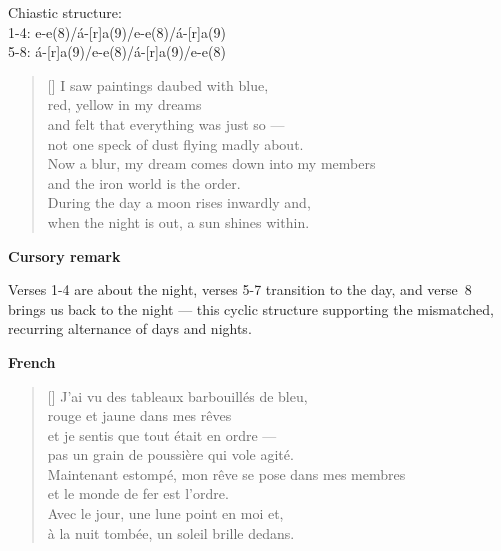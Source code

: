 \documentclass[a4paper,12pt,twoside,final]{book}
\begin{document}

\noindent Chiastic structure: \\
1-4: e-e(8)/á-[r]a(9)/e-e(8)/á-[r]a(9) \\
5-8: á-[r]a(9)/e-e(8)/á-[r]a(9)/e-e(8)

\newpage



\settowidth{\versewidth}{Now a blur, my dream comes down into my members}

\begin{verse}[\versewidth]
  I saw paintings daubed with blue, \\
  red, yellow in my dreams \\
  and felt that everything was just so ---\\
  not one speck of dust flying madly about. \\
  Now a blur, my dream comes down into my members \\
  and the iron world is the order. \\
  During the day a moon rises inwardly and, \\
  when the night is out, a sun shines within. \\
\end{verse}

\bigskip

\noindent \textbf{Cursory remark}

\medskip

Verses 1-4 are about the night, verses 5-7 transition to the day, and
verse~8 brings us back to the night --- this cyclic structure
supporting the mismatched, recurring alternance of days and
nights.

\bigskip

\noindent \textbf{French}


\settowidth{\versewidth}{Maintenant estompé, mon rêve se pose dans mes membres}

\begin{verse}[\versewidth]
  J'ai vu des tableaux barbouillés de bleu, \\
  rouge et jaune dans mes rêves \\
  et je sentis que tout était en ordre --- \\
  pas un grain de poussière qui vole agité. \\
  Maintenant estompé, mon rêve se pose dans mes membres \\
  et le monde de fer est l'ordre. \\
  Avec le jour, une lune point en moi et, \\
  à la nuit tombée, un soleil brille dedans. \\
\end{verse}
\end{document}
